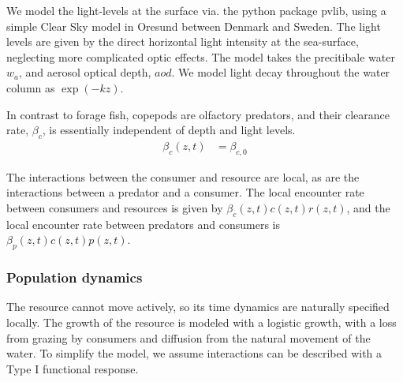 We model the light-levels at the surface via. the python package pvlib, using a simple Clear Sky model in Oresund between Denmark and Sweden. The light levels are given by the direct horizontal light intensity at the sea-surface, neglecting more complicated optic effects. The model takes the precitibale water $w_a$, and aerosol optical depth, $aod$. We model light decay throughout the water column as $\exp(-kz)$.


In contrast to forage fish, copepods are olfactory predators, and their clearance rate, $\beta_c$, is essentially independent of depth and light levels.
\begin{align*}
	\beta_c(z,t) &=  \beta_{c,0}
\end{align*}

The interactions between the consumer and resource are local, as are the interactions between a predator and a consumer. The local encounter rate between consumers and resources is given by $\beta_c(z,t)c(z,t)r(z,t)$, and the local encounter rate between predators and consumers is $\beta_p(z,t)c(z,t)p(z,t)$.

\subsubsection*{Population dynamics}

%
The resource cannot move actively, so its time dynamics are naturally specified locally. The growth of the resource is modeled with a logistic growth, with a loss from grazing by consumers and diffusion from the natural movement of the water. To simplify the model, we assume interactions can be described with a Type I functional response. %


